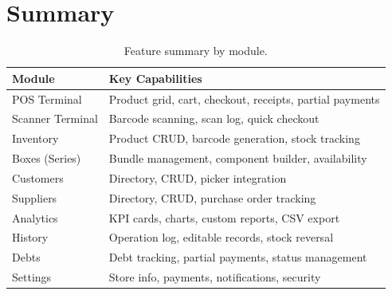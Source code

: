 \documentclass[12pt,a4paper]{article}
\begin{document}
\section{Summary}

\begin{table}[h!]
\centering
\begin{tabular}{@{} l l @{}}
\toprule
\textbf{Module}           & \textbf{Key Capabilities} \\
\midrule
POS Terminal              & Product grid, cart, checkout, receipts, partial payments \\
Scanner Terminal           & Barcode scanning, scan log, quick checkout \\
Inventory                 & Product CRUD, barcode generation, stock tracking \\
Boxes (Series)            & Bundle management, component builder, availability \\
Customers                 & Directory, CRUD, picker integration \\
Suppliers                 & Directory, CRUD, purchase order tracking \\
Analytics                 & KPI cards, charts, custom reports, CSV export \\
History                   & Operation log, editable records, stock reversal \\
Debts                     & Debt tracking, partial payments, status management \\
Settings                  & Store info, payments, notifications, security \\
\bottomrule
\end{tabular}
\caption{Feature summary by module.}
\end{table}
\end{document}
